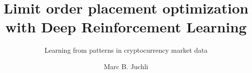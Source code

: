 \documentclass[whitelogo]{tudelft-report}
\begin{document}
\frontmatter


\title[tudelft-white]{Limit order placement optimization with Deep Reinforcement Learning}
\subtitle[tudelft-black]{Learning from patterns in cryptocurrency market data}
\author[tudelft-white]{Marc B. Juchli}








\tableofcontents

\mainmatter









\appendix

%


\end{document}
